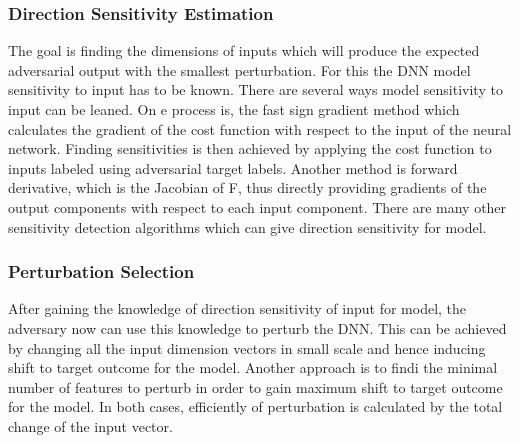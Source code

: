 \documentclass[12pt]{article}
\begin{document}
\subsubsection*{Direction Sensitivity Estimation}
The goal is finding the dimensions of inputs which will produce the expected adversarial output with the smallest perturbation\cite{paper}. For this the DNN model sensitivity to input has to be known. There are several ways model sensitivity to input can be leaned. On e process is, the fast sign
gradient method which calculates the gradient of the cost function
with respect to the input of the neural network. Finding
sensitivities is then achieved by applying the cost function
to inputs labeled using adversarial target labels\cite{paper}. Another method is forward derivative, which is the Jacobian of F, thus directly providing gradients of the output components with respect to each input
component\cite{paper}. There are many other sensitivity detection algorithms which can give direction sensitivity for model.
\subsubsection*{Perturbation Selection}
After gaining the knowledge of direction sensitivity of input for model, the adversary now can use this knowledge to perturb the DNN. This can be achieved by changing all the input dimension vectors in small scale and hence inducing shift to target outcome for the model. Another approach is to findi the minimal number of features to perturb in order to gain maximum shift to target outcome for the model. In both cases, efficiently of perturbation is calculated by the total change of the input vector.
\end{document}
